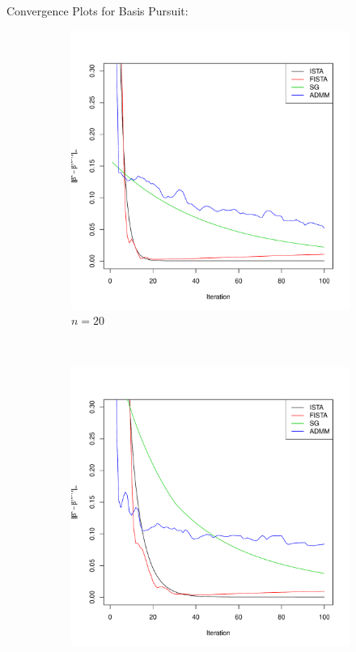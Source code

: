 \documentclass[xcolor=dvipsnames,aspectratio=1610]{beamer}
\theoremstyle{remark}
\begin{document}
\begin{frame}{Convergence Plots for Basis Pursuit:}
\fontsize{6pt}{7.2}\selectfont
\begin{figure}[H]
  \centering
    \begin{subfigure}[b]{0.2\textwidth}
        \includegraphics[width=\textwidth]{20cvgc.pdf}
        \caption{$n=20$}
        \label{fig:20}
    \end{subfigure}
~
    \begin{subfigure}[b]{0.2\textwidth}
        \includegraphics[width=\textwidth]{50cvgc.pdf}

\end{subfigure}
\end{figure}
\end{frame}
\end{document}
